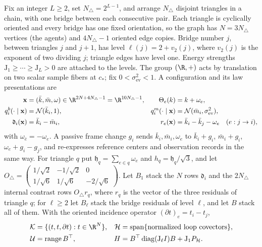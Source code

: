 Fix an integer \(L\ge2\), set \(N_\triangle=2^{L-1}\), and arrange
\(N_\triangle\) disjoint triangles in a chain, with one bridge between each
consecutive pair. Each triangle is cyclically oriented and every bridge has
one fixed orientation, so the graph has \(N=3N_\triangle\) vertices (the
agents) and \(4N_\triangle-1\) oriented edge copies. Bridge number \(j\),
between triangles \(j\) and \(j+1\), has level \(\ell(j)=2+v_2(j)\), where
\(v_2(j)\) is the exponent of two dividing \(j\); triangle edges have level
one. Energy strengths \(\mathrm J_1\ge\cdots\ge\mathrm J_L>0\) are attached to
the levels. The group \((\R,+)\) acts by translation on two scalar sample
fibers at \(c_*\); fix \(0<\sigma^2_{\mathrm{ev}}<1\). A configuration and its
law presentations are
\begin{equation}
\begin{aligned}
\mathbf x&=(\bar k,\bar m,\omega)\in\R^{2N+4N_\triangle-1}=\R^{10N_\triangle-1},&
\Theta_e(k)&=k+\omega_e,\\
q_i^b(\cdot\mid\mathbf x)&=\mathcal N(\bar k_i,1),&
q_i^m(\cdot\mid\mathbf x)&=\mathcal N(\bar m_i,\sigma^2_{\mathrm{ev}}),\\
\mathfrak d_i(\mathbf x)&=\bar k_i-\bar m_i,&
r_e(\mathbf x)&=\bar k_i-\bar k_j-\omega_e\quad(e:j\to i),
\end{aligned}
\label{eq:rg-formation-configuration}
\end{equation}
with \(\omega_{\bar e}=-\omega_e\). A passive frame change \(g_i\) sends
\(\bar k_i,\bar m_i,\omega_e\) to \(\bar k_i+g_i\), \(\bar m_i+g_i\),
\(\omega_e+g_i-g_j\), and re-expresses reference centers and observation
records in the same way. For triangle \(q\) put
\(\mathfrak h_q=\sum_{e\in q}\omega_e\) and \(h_q=\mathfrak h_q/\sqrt3\), and
let
\(O_\triangle=\begin{pmatrix}1/\sqrt2&-1/\sqrt2&0\\1/\sqrt6&1/\sqrt6&-2/\sqrt6\end{pmatrix}\).
Let \(B_1\) stack the \(N\) rows \(\mathfrak d_i\) and the \(2N_\triangle\)
internal contrast rows \(O_\triangle r_q\), where \(r_q\) is the vector of the
three residuals of triangle \(q\); for \(\ell\ge2\) let \(B_\ell\) stack the
bridge residuals of level \(\ell\), and let \(B\) stack all of them. With the
oriented incidence operator \((\partial t)_e=t_i-t_j\),
\begin{equation}
\begin{aligned}
\mathcal K&=\{(t,t,\partial t):t\in\R^N\},&
\mathcal H&=\operatorname{span}\{\text{normalized loop covectors}\},\\
\mathcal U&=\operatorname{range}B^\top,&
H&=B^\top\operatorname{diag}(\mathrm J_\ell I)B+\mathrm J_1P_{\mathcal H}.
\end{aligned}
\label{eq:rg-formation-orthogonal-split}
\end{equation}
